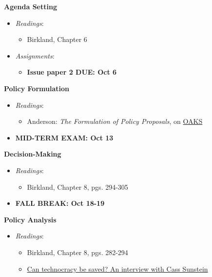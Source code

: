 \week \textbf{Agenda Setting}

\begin{itemize}

\item
  \emph{Readings}:

  \begin{itemize}
  
  \item
    Birkland, Chapter 6
  \end{itemize}
\item
  \emph{Assignments}:

  \begin{itemize}
  
  \item
    \textbf{Issue paper 2 DUE: Oct 6}
  \end{itemize}
\end{itemize}

\week \textbf{Policy Formulation}

\begin{itemize}

\item
  \emph{Readings}:

  \begin{itemize}
  
  \item
    Anderson: \emph{The Formulation of Policy Proposals}, on
    \href{https://lms.cofc.edu/d2l/login}{OAKS}
  \end{itemize}
\item
  \textbf{MID-TERM EXAM: Oct 13}
\end{itemize}

\week \textbf{Decision-Making}

\begin{itemize}

\item
  \emph{Readings}:

  \begin{itemize}
  
  \item
    Birkland, Chapter 8, pgs. 294-305
  \end{itemize}
\item
  \textbf{FALL BREAK: Oct 18-19}
\end{itemize}

\week \textbf{Policy Analysis}

\begin{itemize}

\item
  \emph{Readings}:

  \begin{itemize}
  
  \item
    Birkland, Chapter 8, pgs. 282-294
  \item
    \href{https://www.vox.com/future-perfect/2018/10/22/18001014/cass-sunstein-cost-benefit-analysis-technocracy-liberalism}{Can
    technocracy be saved? An interview with Cass Sunstein}
  \end{itemize}
\end{itemize}

